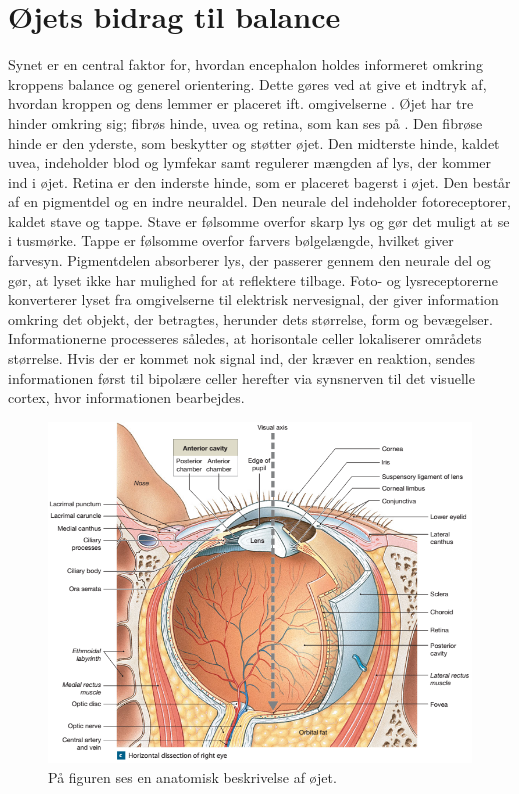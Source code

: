 \section{Øjets bidrag til balance}
Synet er en central faktor for, hvordan encephalon holdes informeret omkring kroppens balance og generel orientering. Dette gøres ved at give et indtryk af, hvordan kroppen og dens lemmer er placeret ift. omgivelserne \cite{Schulmann1987}. Øjet har tre hinder omkring sig; fibrøs hinde, uvea og retina, som kan ses på . Den fibrøse hinde er den yderste, som beskytter og støtter øjet. Den midterste hinde, kaldet uvea, indeholder blod og lymfekar samt regulerer mængden af lys, der kommer ind i øjet. Retina er den inderste hinde, som er placeret bagerst i øjet. Den består af en pigmentdel og en indre neuraldel. Den neurale del indeholder fotoreceptorer, kaldet stave og tappe. Stave er følsomme overfor skarp lys og gør det muligt at se i tusmørke. Tappe er følsomme overfor farvers bølgelængde, hvilket giver farvesyn. Pigmentdelen absorberer lys, der passerer gennem den neurale del og gør, at lyset ikke har mulighed for at reflektere tilbage. Foto- og lysreceptorerne konverterer lyset fra omgivelserne til elektrisk nervesignal, der giver information omkring det objekt, der betragtes, herunder dets størrelse, form og bevægelser. Informationerne processeres således, at horisontale celler lokaliserer områdets størrelse. Hvis der er kommet nok signal ind, der kræver en reaktion, sendes informationen først til bipolære celler herefter via synsnerven til det visuelle cortex, hvor informationen bearbejdes. \cite{Martini2012}     

\begin{figure}[H]
	\centering
	\includegraphics[scale=0.75]{figures/bProblemanalyse/Oejets-anatomi.png}
	\caption{På figuren ses en anatomisk beskrivelse af øjet. \cite{Martini2012}}
	\label{Oejet}
\end{figure}


